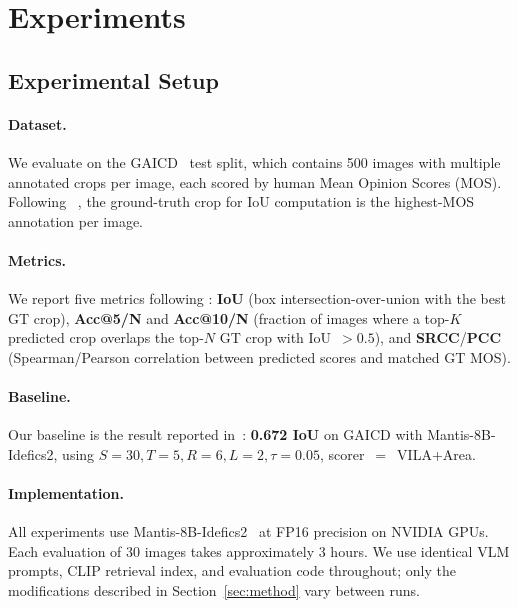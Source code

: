 \section{Experiments}
\label{sec:experiments}

\subsection{Experimental Setup}
\label{sec:setup}

\paragraph{Dataset.}
We evaluate on the GAICD~\cite{gaicd2020} test split, which contains
500 images with multiple annotated crops per image, each scored by
human Mean Opinion Scores (MOS).  Following \baseline~\cite{cropper2025},
the ground-truth crop for IoU computation is the highest-MOS annotation
per image.

\paragraph{Metrics.}
We report five metrics following \baseline: \textbf{IoU} (box
intersection-over-union with the best GT crop), \textbf{Acc@5/N} and
\textbf{Acc@10/N} (fraction of images where a top-$K$ predicted crop
overlaps the top-$N$ GT crop with IoU~$> 0.5$), and \textbf{SRCC}/\textbf{PCC}
(Spearman/Pearson correlation between predicted scores and matched GT MOS).

\paragraph{Baseline.}
Our baseline is the \baseline result reported in~\cite{cropper2025}:
\textbf{0.672 IoU} on GAICD with Mantis-8B-Idefics2, using
$S{=}30, T{=}5, R{=}6, L{=}2, \tau{=}0.05$, scorer~$=$~VILA+Area.

\paragraph{Implementation.}
All experiments use Mantis-8B-Idefics2~\cite{mantis2024} at FP16
precision on NVIDIA GPUs.  Each evaluation of 30 images takes
approximately 3 hours.  We use identical VLM prompts, CLIP retrieval
index, and evaluation code throughout; only the modifications described
in Section~\ref{sec:method} vary between runs.

